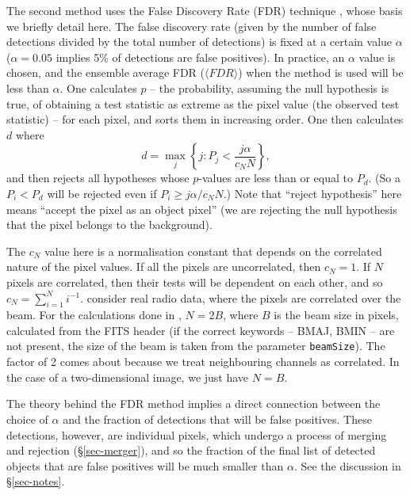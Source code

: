 The second method uses the False Discovery Rate (FDR) technique
\citep{miller01,hopkins02}, whose basis we briefly detail here. The
false discovery rate (given by the number of false detections divided
by the total number of detections) is fixed at a certain value
$\alpha$ (\eg $\alpha=0.05$ implies 5\% of detections are false
positives). In practice, an $\alpha$ value is chosen, and the ensemble
average FDR (\ie $\langle FDR \rangle$) when the method is used will
be less than $\alpha$.  One calculates $p$ -- the probability,
assuming the null hypothesis is true, of obtaining a test statistic as
extreme as the pixel value (the observed test statistic) -- for each
pixel, and sorts them in increasing order. One then calculates $d$
where
\[
d = \max_j \left\{ j : P_j < \frac{j\alpha}{c_N N} \right\},
\]
and then rejects all hypotheses whose $p$-values are less than or
equal to $P_d$. (So a $P_i<P_d$ will be rejected even if $P_i \geq
j\alpha/c_N N$.) Note that ``reject hypothesis'' here means ``accept
the pixel as an object pixel'' (\ie we are rejecting the null
hypothesis that the pixel belongs to the background).

The $c_N$ value here is a normalisation constant that depends on the
correlated nature of the pixel values. If all the pixels are
uncorrelated, then $c_N=1$. If $N$ pixels are correlated, then their
tests will be dependent on each other, and so $c_N = \sum_{i=1}^N
i^{-1}$. \citet{hopkins02} consider real radio data, where the pixels
are correlated over the beam. For the calculations done in \duchamp,
$N=2B$, where $B$ is the beam size in pixels, calculated from the FITS
header (if the correct keywords -- BMAJ, BMIN -- are not present, the
size of the beam is taken from the parameter \texttt{beamSize}). The
factor of 2 comes about because we treat neighbouring channels as
correlated. In the case of a two-dimensional image, we just have
$N=B$. 

The theory behind the FDR method implies a direct connection between
the choice of $\alpha$ and the fraction of detections that will be
false positives. These detections, however, are individual pixels,
which undergo a process of merging and rejection (\S\ref{sec-merger}),
and so the fraction of the final list of detected objects that are
false positives will be much smaller than $\alpha$. See the discussion
in \S\ref{sec-notes}.

%


